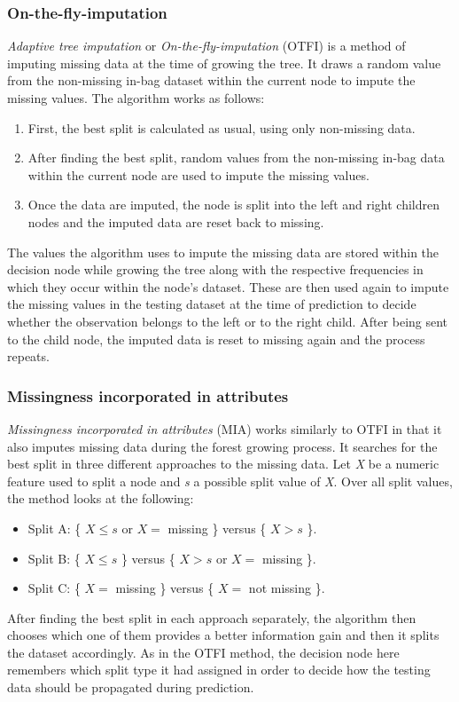 \documentclass[11pt]{article}
\begin{document}
      \subsubsection{On-the-fly-imputation}
        {\it Adaptive tree imputation} \cite{rsf} or {\it On-the-fly-imputation} \cite{otfi} (OTFI) is a method of imputing missing data at the time of growing the tree. It draws a random value from the non-missing in-bag dataset within the current node to impute the missing values. The algorithm works as follows: 
        \begin{enumerate}
        \item First, the best split is calculated as usual, using only non-missing data.
        \item After finding the best split, random values from the non-missing in-bag data within the current node are used to impute the missing values.
        \item Once the data are imputed, the node is split into the left and right children nodes and the imputed data are reset back to missing.
        \end{enumerate}
        The values the algorithm uses to impute the missing data are stored within the decision node while growing the tree along with the respective frequencies in which they occur within the node's dataset. These are then used again to impute the missing values in the testing dataset at the time of prediction to decide whether the observation belongs to the left or to the right child. After being sent to the child node, the imputed data is reset to missing again and the process repeats.
      \subsubsection{Missingness incorporated in attributes}
        {\it Missingness incorporated in attributes} \cite{mia} (MIA) works similarly to OTFI in that it also imputes missing data during the forest growing process. It searches for the best split in three different approaches to the missing data. Let {\it X} be a numeric feature used to split a node and {\it s} a possible split value of {\it X}. Over all split values, the method looks at the following:
        \begin{itemize}
        \item Split A: \{ $X \leq s$ or $X =$ missing \} versus \{ $X > s$ \}.
        \item Split B: \{ $X \leq s$ \} versus \{ $X > s$ or $X =$ missing \}.
        \item Split C: \{ $X =$ missing \} versus \{ $X =$ not missing \}.
        \end{itemize}
        After finding the best split in each approach separately, the algorithm then chooses which one of them provides a better information gain and then it splits the dataset accordingly. As in the OTFI method, the decision node here remembers which split type it had assigned in order to decide how the testing data should be propagated during prediction.
\end{document}
